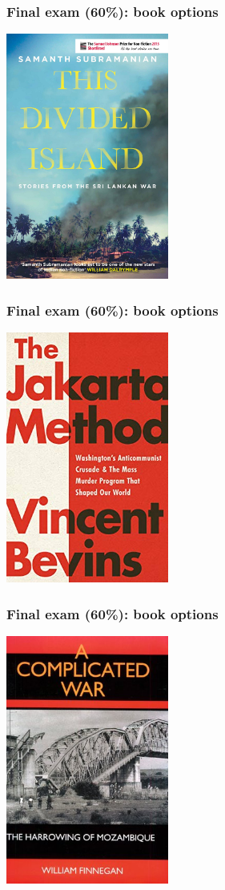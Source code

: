 \documentclass[aspectratio=43]{beamer}
\begin{document}
\begin{frame}
\frametitle{Final exam (60\%): book options}
\centering

\includegraphics[width = 0.4\textwidth]{img/this_divided_island}

\end{frame}

\begin{frame}
\frametitle{Final exam (60\%): book options}
\centering

\includegraphics[width = 0.4\textwidth]{img/jakarta_bevins}

\end{frame}

\begin{frame}
\frametitle{Final exam (60\%): book options}
\centering

\includegraphics[width = 0.4\textwidth]{img/finnegan_mozambique}

\end{frame}
\end{document}

